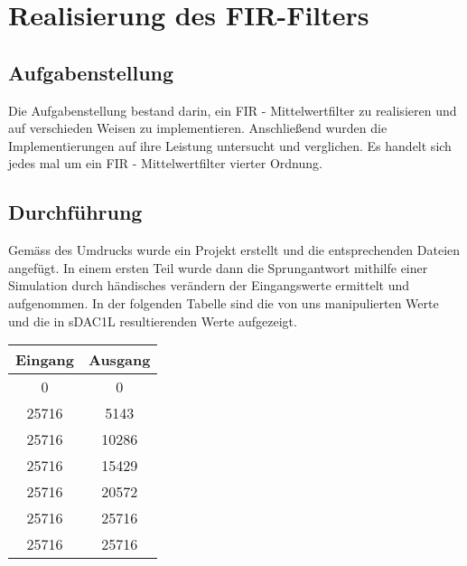 \chapter{Realisierung des FIR-Filters}\label{Cha:RealFIR}
\section{Aufgabenstellung}
Die Aufgabenstellung bestand darin, ein FIR - Mittelwertfilter zu realisieren und auf verschieden Weisen zu implementieren.
Anschließend wurden die Implementierungen auf ihre Leistung untersucht und verglichen. Es handelt sich jedes mal um ein FIR - Mittelwertfilter vierter Ordnung.

\section{Durchf\"uhrung}
Gemäss des Umdrucks wurde ein Projekt erstellt und die entsprechenden Dateien angefügt. In einem ersten Teil wurde dann die Sprungantwort mithilfe einer Simulation durch händisches verändern der Eingangswerte ermittelt und aufgenommen. 
In der folgenden Tabelle sind die von uns manipulierten Werte und die in sDAC1L resultierenden Werte aufgezeigt.
\begin{center}
\begin{tabular}{|c|c|}
\hline 
Eingang & Ausgang \\ 
\hline 
0 & 0 \\ 
\hline 
25716 & 5143 \\ 
\hline 
25716 & 10286 \\ 
\hline 
25716 & 15429 \\ 
\hline 
25716 & 20572 \\ 
\hline 
25716 & 25716 \\ 
\hline 
25716 & 25716 \\ 
\hline 
\end{tabular} 
\end{center}

